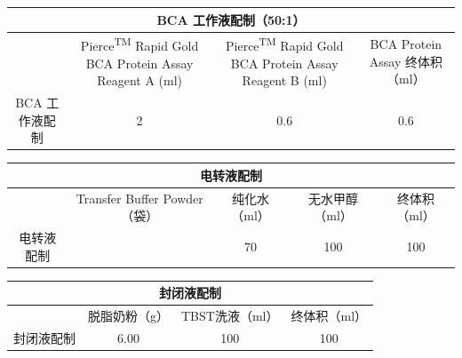 \documentclass[UTF8,10pt,a4paper,fontset=fandol]{ctexart}
\newcommand{\fieldvalue}[1]{#1}
\newcommand{\handwritten}[1]{#1}
\begin{document}
\vspace{2mm}

\begin{tabular}{|c|c|c|c|}
\hline
\multicolumn{4}{|c|}{BCA 工作液配制（50:1）} \\
\hline
 & Pierce\textsuperscript{TM} Rapid Gold BCA Protein Assay Reagent A (ml)
 & Pierce\textsuperscript{TM} Rapid Gold BCA Protein Assay Reagent B (ml)
 & BCA Protein Assay 终体积（ml） \\
\hline
BCA 工作液配制 &
\fieldvalue{\handwritten{2}} &
\fieldvalue{\handwritten{0.6}} &
\fieldvalue{\handwritten{0.6}} \\
\hline
\end{tabular}

\vspace{2mm}

\begin{tabular}{|c|c|c|c|c|}
\hline
\multicolumn{5}{|c|}{电转液配制} \\
\hline
 & Transfer Buffer Powder（袋） & 纯化水（ml） & 无水甲醇（ml） & 终体积（ml） \\
\hline
电转液配制 & &
\fieldvalue{\handwritten{70}} &
\fieldvalue{\handwritten{100}} &
\fieldvalue{\handwritten{100}} \\
\hline
\end{tabular}

\vspace{2mm}

\begin{tabular}{|c|c|c|c|}
\hline
\multicolumn{4}{|c|}{封闭液配制} \\
\hline
 & 脱脂奶粉（g） & TBST洗液（ml） & 终体积（ml） \\
\hline
封闭液配制 &
\fieldvalue{\handwritten{6.00}} &
\fieldvalue{\handwritten{100}} &
\fieldvalue{\handwritten{100}} \\
\hline
\end{tabular}
\end{document}
